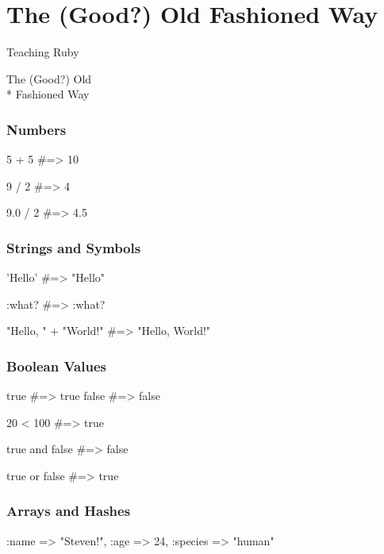 \documentclass[20pt]{beamer}
\begin{document}
\section{The (Good?) Old Fashioned Way}
{
\begin{frame}
\par { Teaching Ruby}\par
\vspace{3cm}\hfill
{The (Good?) Old\\* \hfill Fashioned Way}
\end{frame}
}

\begin{frame}[fragile]
\frametitle{Numbers}
\begin{rubycode}
5 + 5 #=> 10

9 / 2 #=> 4

9.0 / 2 #=> 4.5
\end{rubycode}
\end{frame}

\begin{frame}[fragile]
\frametitle{Strings and Symbols}
\begin{rubycode}
'Hello' #=> "Hello"

:what?  #=> :what?

"Hello, " + "World!"
#=> "Hello, World!"
\end{rubycode}
\end{frame}

\begin{frame}[fragile]
\frametitle{Boolean Values}
\begin{rubycode}
true #=> true
false #=> false

20 < 100 #=> true

true and false #=> false

true or false #=> true
\end{rubycode}
\end{frame}

\begin{frame}[fragile]
\frametitle{Arrays and Hashes}
\begin{rubycode}
[ 1, 2, 3.0, "four" ]

{ :name => "Steven!",
:age => 24,
:species => "human" }
\end{rubycode}
\end{frame}
\end{document}
